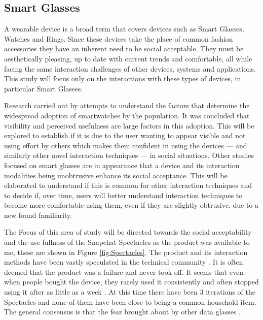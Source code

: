 \documentclass{l4proj}
\begin{document}
\subsection{Smart Glasses}

A wearable device is a broad term that covers devices such as Smart Glasses, Watches and Rings. Since these devices take the place of common fashion accessories they have an inherent need to be social acceptable. They must be  aesthetically pleasing, up to date with current trends and comfortable, all while facing the same interaction challenges of other devices, systems and applications. This study will focus only on the interactions with these types of devices, in particular Smart Glasses.

Research carried out by \citet{chuah_wearable_2016} attempts to understand the factors that determine the widespread adoption of smartwatches by the population. It was concluded that visibility and perceived usefulness are large factors in this adoption. This will be explored to establish if it is due to the user wanting to appear visible and not using effort by others which makes them confident in using the devices --- and similarly other novel interaction techniques --- in social situations. Other studies focused on smart glasses are in appearance that a device and its interaction modalities being unobtrusive enhance its social acceptance. This will be elaborated to understand if this is common for other interaction techniques and to decide if, over time, users will better understand interaction techniques to become more comfortable using them, even if they are slightly obtrusive, due to a new found familiarity.

The Focus of this area of study will be directed towards the social acceptability and the use fullness of the Snapchat Spectacles as the product was available to me, these are shown in Figure \ref{fig:Spectacles}. The product and its interaction methods have been vastly speculated in the technical community \citep{constine_why_2017}. It is often deemed that the product was a failure and never took off. It seems that even when people bought the device, they rarely used it consistently and often stopped using it after as little as a week \citep{constine_why_2017}. At this time there have been 3 iterations of the Spectacles and none of them have been close to being a common household item. The general consensus is that the fear brought about by other data glasses \citep{koelle_dont_2015}.
\end{document}
